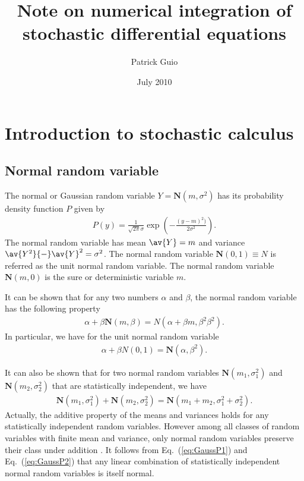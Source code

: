 \documentclass[10pt,a4paper]{article}
\title{Note on numerical integration of stochastic differential equations}
\author{Patrick Guio}
\date{July 2010}
\newcommand{\eq}[1]{Eq.~(\ref{#1})}
\newcommand{\gaussian}{\ensuremath{\mathbf{N}}}
\begin{document}
\maketitle

\section{Introduction to stochastic calculus}

\subsection{Normal random variable}
\label{sub:normal}

The normal or Gaussian random variable $Y=\gaussian(m,\sigma^2)$ has its 
probability density function $P$ given by
\begin{align}
P(y)=\frac{1}{\sqrt{2\pi}\sigma}\exp\left(-\frac{(y-m)^2)}{2\sigma^2}\right).
\end{align}
The normal random variable has mean $\av{Y}=m$ and variance 
$\av{Y^2}{-}\av{Y}^2=\sigma^2$. The normal random variable
$\gaussian(0,1)\equiv N$ is referred as the unit normal random variable.
The normal random variable $\gaussian(m,0)$ is the sure or deterministic
variable $m$.

It can be shown that for any two numbers $\alpha$ and $\beta$, the normal
random variable has the following property \citep{gillespie:1996a}
\begin{align}
\alpha+\beta\gaussian(m,\beta) = N(\alpha+\beta m,\beta^2\beta^2).
\label{eq:GaussP1}
\end{align}
In particular, we have for the unit normal random variable
\begin{align}
\alpha+\beta N(0,1) = \gaussian(\alpha,\beta^2).\label{eq:unitGaussP1}
\end{align}

It can also be shown that for two normal random variables 
$\gaussian(m_1,\sigma_1^2)$ and $\gaussian(m_2,\sigma_2^2)$ that are
statistically independent, we have 
\begin{align}
\gaussian(m_1,\sigma_1^2)+\gaussian(m_2,\sigma_2^2)=
\gaussian(m_1+m_2,\sigma_1^2+\sigma_2^2).
\label{eq:GaussP2}
\end{align}
Actually, the additive property of the means and variances holds for any
statistically independent random variables. However among all classes of
random variables with finite mean and variance, only normal random variables
preserve their class under addition \citep{gillespie:1996a}.
It follows from \eq{eq:GaussP1} and \eq{eq:GaussP2} that any linear
combination of statistically independent normal random variables is itself
normal.
\end{document}
